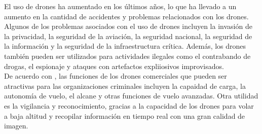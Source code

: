 \begin{justify}
    El uso de drones ha aumentado en los últimos años, lo que ha llevado a un aumento en la cantidad de accidentes y problemas relacionados con los drones.
    Algunos de los problemas asociados con el uso de drones incluyen la invasión de la privacidad, la seguridad de la aviación, la seguridad nacional,
    la seguridad de la información y la seguridad de la infraestructura crítica. Además, los drones también pueden ser utilizados para actividades ilegales
    como el contrabando de drogas, el espionaje y ataques con artefactos expliiosivos improvisados.\\

    De acuerdo con \textcite{cossio2018drones}, las funciones de los drones comerciales que pueden ser atractivas
    para las organizaciones criminales incluyen la capaidad de carga, la autonomía de vuelo, el alcane y otras funciones de vuelo avanzadas. Otra utilidad
    es la vigilancia y reconocimiento, gracias a la capacidad de los drones para volar a baja altitud y
    recopilar información en tiempo real con una gran calidad de imagen.
\end{justify}